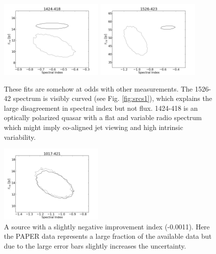 \documentclass[preprint]{aastex}
\begin{document}
\begin{figure}[htbp]
\begin{center}
\includegraphics[width=2in]{plots/1424-418_SI_MCMC.png} %
\includegraphics[width=2in]{plots/1526-423_SI_MCMC.png} %

\end{center}
\caption{
These fits are somehow at odds with other measurements.  The 1526-42 spectrum is visibly curved (see Fig. \ref{fig:srcs1}), which explains the large disagreement in spectral index but not flux. 1424-418 is an optically polarized quasar with a flat and variable radio spectrum which might imply co-aligned jet viewing and high intrinsic variability. 
} \label{fig:SI_contour_new}
\end{figure}

\begin{figure}[htbp]
\begin{center}
\includegraphics[width=2in]{plots/1017-421_SI_MCMC.png} %
\end{center}
\caption{A source with a slightly negative improvement index (-0.0011).  Here the PAPER data represents a large fraction of the available data
but due to the large error bars slightly increases the uncertainty.
}\label{fig:SI_contour_bad}
\end{figure}
\end{document}
